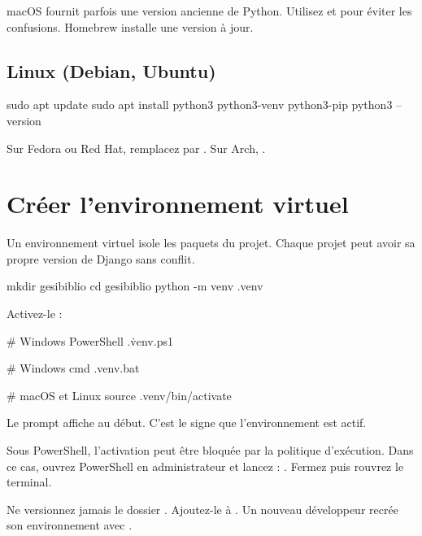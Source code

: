 \begin{note}
macOS fournit parfois une version ancienne de Python. Utilisez  et
 pour éviter les confusions. Homebrew installe une version à jour.
\end{note}

\subsection{Linux (Debian, Ubuntu)}

\begin{terminal}
sudo apt update
sudo apt install python3 python3-venv python3-pip
python3 --version
\end{terminal}

Sur Fedora ou Red Hat, remplacez  par . Sur Arch,
.

\section{Créer l'environnement virtuel}

Un environnement virtuel isole les paquets du projet. Chaque projet peut avoir sa
propre version de Django sans conflit.

\begin{terminal}
mkdir gesibiblio
cd gesibiblio
python -m venv .venv
\end{terminal}

Activez-le :

\begin{terminal}
# Windows PowerShell
.\.venv\Scripts\Activate.ps1

# Windows cmd
.venv\Scripts\activate.bat

# macOS et Linux
source .venv/bin/activate
\end{terminal}

Le prompt affiche  au début. C'est le signe que l'environnement est
actif.

\begin{attention}
Sous PowerShell, l'activation peut être bloquée par la politique d'exécution. Dans
ce cas, ouvrez PowerShell en administrateur et lancez :
. Fermez puis rouvrez le
terminal.
\end{attention}

\begin{bonne}
Ne versionnez jamais le dossier . Ajoutez-le à . Un
nouveau développeur recrée son environnement avec .
\end{bonne}

